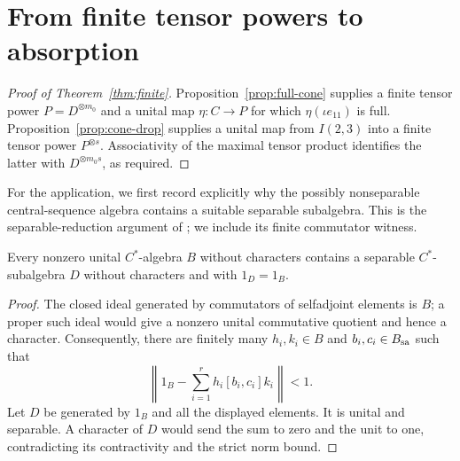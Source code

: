 \section{From finite tensor powers to absorption}\label{sec:application}

\begin{proof}[Proof of Theorem~\ref{thm:finite}]
Proposition~\ref{prop:full-cone} supplies a finite tensor power
$P=D^{\otimes m_0}$ and a unital map $\eta:C\to P$ for which
$\eta(\iota e_{11})$ is full. Proposition~\ref{prop:cone-drop} supplies a
unital map from $I(2,3)$ into a finite tensor power $P^{\otimes s}$.
Associativity of the maximal tensor product identifies the latter with
$D^{\otimes m_0s}$, as required.
\end{proof}

For the application, we first record explicitly why the possibly
nonseparable central-sequence algebra contains a suitable separable
subalgebra. This is the separable-reduction argument of
\cite[Lemma~3.5]{KR}; we include its finite commutator witness.

\begin{lemma}\label{lem:separable}
Every nonzero unital $C^*$-algebra $B$ without characters contains a
separable $C^*$-subalgebra $D$ without characters and with $1_D=1_B$.
\end{lemma}
\begin{proof}
The closed ideal generated by commutators of selfadjoint elements is $B$;
a proper such ideal would give a nonzero unital commutative quotient and
hence a character. Consequently, there are finitely many
$h_i,k_i\in B$ and $b_i,c_i\in B_{\mathrm{sa}}$ such that
\[
 \left\|1_B-\sum_{i=1}^r h_i[b_i,c_i]k_i\right\|<1.
\]
Let $D$ be generated by $1_B$ and all the displayed elements. It is unital
and separable. A character of $D$ would send the sum to zero and the unit
to one, contradicting its contractivity and the strict norm bound.
\end{proof}


